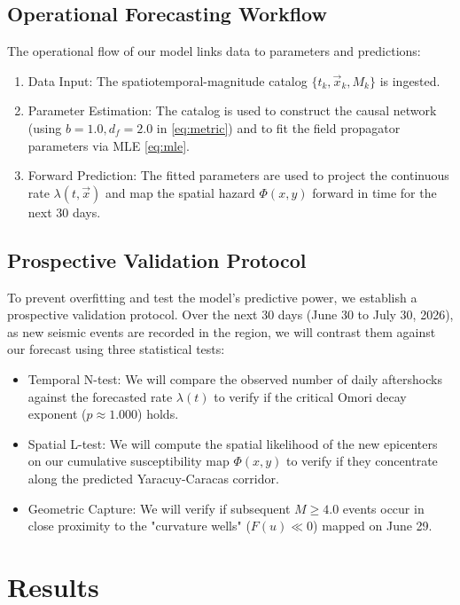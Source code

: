 \documentclass[twocolumn,amsmath,amssymb,aps,pre,superscriptaddress]{revtex4-1}
\begin{document}
\subsection{Operational Forecasting Workflow}
The operational flow of our model links data to parameters and predictions:
\begin{enumerate}
    \item Data Input: The spatiotemporal-magnitude catalog $\{t_k, \vec{x}_k, M_k\}$ is ingested.
    \item Parameter Estimation: The catalog is used to construct the causal network (using $b=1.0, d_f=2.0$ in \eqref{eq:metric}) and to fit the field propagator parameters via MLE \eqref{eq:mle}.
    \item Forward Prediction: The fitted parameters are used to project the continuous rate $\lambda(t, \vec{x})$ and map the spatial hazard $\Phi(x, y)$ forward in time for the next 30 days.
\end{enumerate}

\subsection{Prospective Validation Protocol}
To prevent overfitting and test the model's predictive power, we establish a prospective validation protocol. Over the next 30 days (June 30 to July 30, 2026), as new seismic events are recorded in the region, we will contrast them against our forecast using three statistical tests:
\begin{itemize}
    \item Temporal N-test: We will compare the observed number of daily aftershocks against the forecasted rate $\lambda(t)$ to verify if the critical Omori decay exponent ($p \approx 1.000$) holds.
    \item Spatial L-test: We will compute the spatial likelihood of the new epicenters on our cumulative susceptibility map $\Phi(x, y)$ to verify if they concentrate along the predicted Yaracuy-Caracas corridor.
    \item Geometric Capture: We will verify if subsequent $M \ge 4.0$ events occur in close proximity to the "curvature wells" ($F(u) \ll 0$) mapped on June 29.
\end{itemize}

\section{Results}
\end{document}
